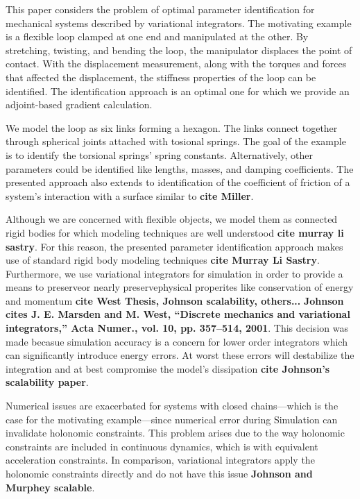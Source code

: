 \documentclass[letterpaper, 10pt, conference]{ieeeconf}
\begin{document}
This paper considers the problem of optimal parameter identification for mechanical systems described by variational integrators.  The motivating example is a flexible loop clamped at one end and manipulated at the other.  By stretching, twisting, and bending the loop, the manipulator displaces the point of contact.  With the displacement measurement, along with the torques and forces that affected the displacement, the stiffness properties of the loop can be identified.  The identification approach is an optimal one for which we provide an adjoint-based gradient calculation.

We model the loop as six links forming a hexagon.  The links connect together through spherical joints attached with tosional springs.  The goal of the example is to identify the torsional springs' spring constants.   Alternatively, other parameters could be identified like lengths, masses, and damping coefficients.  The presented approach also extends to identification of the coefficient of friction of a system's interaction with a surface similar to \textbf{cite Miller}.  %

Although we are concerned with flexible objects, we model them as connected rigid bodies for which modeling techniques are well understood \textbf{cite murray li sastry}.  For this reason, the presented parameter identification approach makes use of standard rigid body modeling techniques \textbf{cite Murray Li Sastry}.  Furthermore, we use variational integrators for simulation in order to provide a means to preserve\textemdash or nearly preserve\textemdash physical properites like conservation of energy and momentum \textbf{cite West Thesis, Johnson scalability, others...} \textbf{Johnson cites J. E. Marsden and M. West, “Discrete mechanics and variational integrators,” Acta Numer., vol. 10, pp. 357–514, 2001}.  This decision was made becasue simulation accuracy is a concern for lower order integrators which can significantly introduce energy errors.  At worst these errors will destabilize the integration and at best compromise the model's dissipation \textbf{cite Johnson's scalability paper}.  

Numerical issues are exacerbated for systems with closed chains---which is the case for the motivating example---since numerical error during Simulation can invalidate holonomic constraints. This problem arises due to the way holonomic constraints are included in continuous dynamics, which is with equivalent acceleration constraints.  In comparison, variational integrators apply the holonomic constraints directly and do not have this issue \textbf{Johnson and Murphey scalable}.
\end{document}
